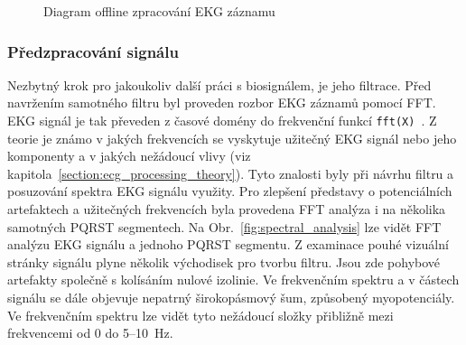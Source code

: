 \begin{figure}[H]
    \centering
    \caption{Diagram offline zpracování EKG záznamu}
    \label{fig:diagram_offline_processing}
\end{figure}

\subsubsection{Předzpracování signálu}
\label{section:preprocessing}
Nezbytný krok pro jakoukoliv další práci s biosignálem, je jeho filtrace. Před
navržením samotného filtru byl proveden rozbor EKG záznamů pomocí FFT. EKG
signál je tak převeden z časové domény do frekvenční funkcí
\texttt{fft(X)}~\cite{matlabFFT}. Z teorie je známo v jakých frekvencích se
vyskytuje užitečný EKG signál nebo jeho komponenty a v jakých nežádoucí vlivy
(viz kapitola~\ref{section:ecg_processing_theory}). Tyto znalosti byly při
návrhu filtru a posuzování spektra EKG signálu využity. Pro zlepšení představy o
potenciálních artefaktech a užitečných frekvencích byla provedena FFT analýza i
na několika samotných PQRST segmentech. Na Obr.~\ref{fig:spectral_analysis} lze
vidět FFT analýzu EKG signálu a jednoho PQRST segmentu. Z examinace pouhé
vizuální stránky signálu plyne několik východisek pro tvorbu filtru. Jsou zde
pohybové artefakty společně s kolísáním nulové izolinie. Ve frekvenčním spektru
a v částech signálu se dále objevuje nepatrný širokopásmový šum, způsobený
myopotenciály. Ve frekvenčním spektru lze vidět tyto nežádoucí složky přibližně
mezi frekvencemi od 0 do 5--10~\si\Hz.

